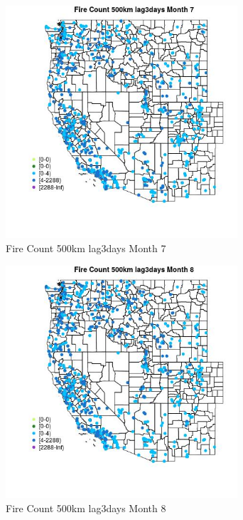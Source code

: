 \begin{figure} 
\centering  
\includegraphics[width=0.77\textwidth]{Code_Outputs/Report_ML_input_PM25_Step4_part_e_de_duplicated_aves_compiled_2019-05-21wNAs_MapObsMo7Fire_Count_500km_lag3days.jpg} 
\caption{\label{fig:Report_ML_input_PM25_Step4_part_e_de_duplicated_aves_compiled_2019-05-21wNAsMapObsMo7Fire_Count_500km_lag3days}Fire Count 500km lag3days Month 7} 
\end{figure} 
 

\clearpage 

\begin{figure} 
\centering  
\includegraphics[width=0.77\textwidth]{Code_Outputs/Report_ML_input_PM25_Step4_part_e_de_duplicated_aves_compiled_2019-05-21wNAs_MapObsMo8Fire_Count_500km_lag3days.jpg} 
\caption{\label{fig:Report_ML_input_PM25_Step4_part_e_de_duplicated_aves_compiled_2019-05-21wNAsMapObsMo8Fire_Count_500km_lag3days}Fire Count 500km lag3days Month 8} 
\end{figure} 
 

